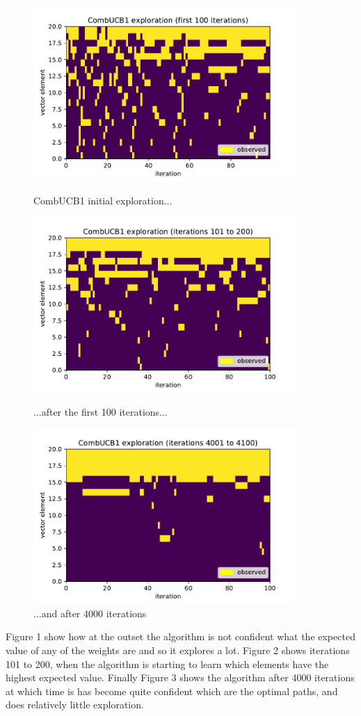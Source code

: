 \begin{figure}%
  \centering
  \includegraphics[width=10cm]{../plots/basicCombUCB1_100iters.pdf}
  \caption{CombUCB1 initial exploration...}
  \label{}
  \includegraphics[width=10cm]{../plots/basicCombUCB1_100_200iters.pdf}
  \caption{...after the first 100 iterations...}
  \label{}
  \includegraphics[width=10cm]{../plots/basicCombUCB1_4000_4100iters.pdf}
  \caption{...and after 4000 iterations}
  \label{}
\end{figure}

Figure 1 show how at the outset the algorithm is not confident what the expected value of any of the weights are and so it explores a lot. Figure 2 shows iterations 101 to 200, when the algorithm is starting to learn which elements have the highest expected value. Finally Figure 3 shows the algorithm after 4000 iterations at which time is has become quite confident which are the optimal paths, and does relatively little exploration.\\

